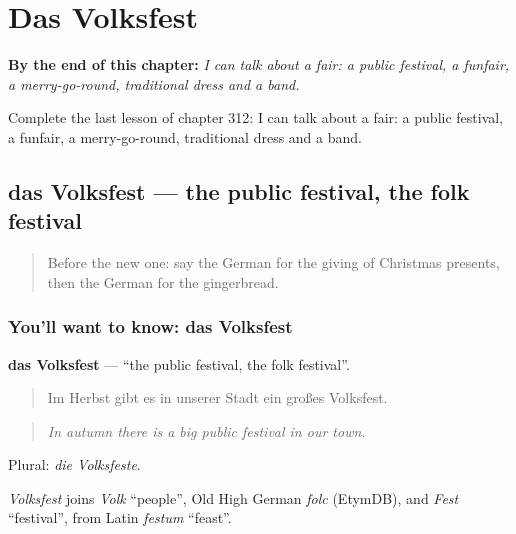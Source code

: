 
\chapter{Das Volksfest}
\label{ch:ge-das-volksfest}

\begin{chapteropening}
\textbf{By the end of this chapter:} \emph{I can talk about a fair: a public festival, a funfair, a merry-go-round, traditional dress and a band.}

Complete the last lesson of chapter 312: I can talk about a fair: a public festival, a funfair, a merry-go-round, traditional dress and a band.
\end{chapteropening}

\section[das Volksfest]{das Volksfest — the public festival, the folk festival}

\label{lesson:GE-C312-volksfest}



\begin{quote}
Before the new one: say the German for the giving of Christmas presents, then the German for the gingerbread.
\end{quote}

\subsection*{You'll want to know: das Volksfest}
\textbf{das Volksfest} — \textquotedblleft{}the public festival, the folk festival\textquotedblright{}.

\begin{quote}
Im Herbst gibt es in unserer Stadt ein großes Volksfest.
\end{quote}

\begin{quote}
\emph{In autumn there is a big public festival in our town.}
\end{quote}

Plural: \emph{die Volksfeste}.

\begin{cousinweb}
\emph{Volksfest} joins \emph{Volk} \textquotedblleft{}people\textquotedblright{}, Old High German \emph{folc} (EtymDB), and \emph{Fest} \textquotedblleft{}festival\textquotedblright{}, from Latin \emph{festum} \textquotedblleft{}feast\textquotedblright{}.
\end{cousinweb}

